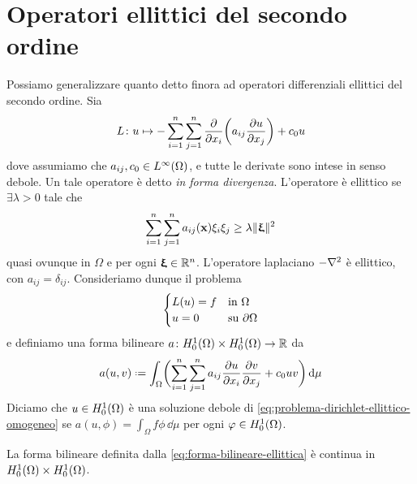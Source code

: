 \section{Operatori ellittici del secondo ordine}
Possiamo generalizzare quanto detto finora ad operatori differenziali ellittici del secondo ordine.
Sia
\begin{equation}
    L\colon u\mapsto-\sum_{i=1}^n\sum_{j=1}^n\drp{}{x_i}\biggl(a_{ij}\drp{u}{x_j}\biggr)+c_0u
    \label{eq:operatore-ellittico-secondo-ordine}
\end{equation}
dove assumiamo che $a_{ij},c_0\in\leb[\infty]{\Omega}$, e tutte le derivate sono intese in senso debole.
Un tale operatore è detto \emph{in forma divergenza}.
L'operatore è ellittico se $\exists\lambda>0$ tale che
\begin{equation}
    \sum_{i=1}^n\sum_{j=1}^na_{ij}(\vec x)\xi_i\xi_j\ge\lambda\norm{\vxi}^2
\end{equation}
quasi ovunque in $\Omega$ e per ogni $\vxi\in\R^n$.
L'operatore laplaciano $-\lap$ è ellittico, con $a_{ij}=\delta_{ij}$.
Consideriamo dunque il problema
\begin{equation}
    \begin{cases}
        L(u)=f & \text{in }\Omega\\
        u=0    & \text{su }\boundary\Omega
    \end{cases}
    \label{eq:problema-dirichlet-ellittico-omogeneo}
\end{equation}
e definiamo una forma bilineare $a\colon\sobHc[1]{\Omega}\times\sobHc[1]{\Omega}\to\R$ da
\begin{equation}
    a(u,v)\defeq\int_\Omega\biggl(\sum_{i=1}^n\sum_{j=1}^na_{ij}\drp{u}{x_i}\drp{v}{x_j}+c_0uv\biggr)\,\dd\mu
    \label{eq:forma-bilineare-ellittica}
\end{equation}
Diciamo che $u\in\sobHc[1]{\Omega}$ è una soluzione debole di \eqref{eq:problema-dirichlet-ellittico-omogeneo} se $a(u,\phi)=\int_\Omega f\phi\,\dd\mu$ per ogni $\phi\in\sobHc[1]{\Omega}$.
\begin{proprieta} \label{pr:continuta-forma-bilineare-ellittica}
    La forma bilineare definita dalla \eqref{eq:forma-bilineare-ellittica} è continua in $\sobHc[1]{\Omega}\times\sobHc[1]{\Omega}$.
\end{proprieta}
